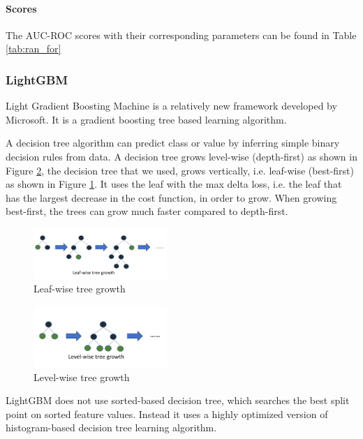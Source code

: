 \documentclass[sigconf, nonacm]{acmart}
\begin{document}
\paragraph{Scores}
The AUC-ROC scores with their corresponding parameters can be found in Table \ref{tab:ran_for}

\subsubsection{LightGBM} \label{subsubsec:lgb}

Light Gradient Boosting Machine\cite{Ke2017LightGBMAH} is a relatively new framework developed by Microsoft. It is a gradient boosting tree based learning algorithm.

A decision tree algorithm can predict class or value by inferring simple binary decision rules from data. A decision tree grows level-wise (depth-first) as shown in Figure \ref{fig:lgb_level}, the decision tree that we used, grows vertically, i.e. leaf-wise (best-first) as shown in Figure \ref{fig:lgb_leaf}. It uses the leaf with the max delta loss, i.e. the leaf that has the largest decrease in the cost function, in order to grow. When growing best-first, the trees can grow much faster compared to depth-first.

\begin{figure}[h]
	\centering
	\includegraphics[width=0.45\textwidth]{lgb/1_AZsSoXb8lc5N6mnhqX5JCg.png}
	\caption{Leaf-wise tree growth}
	\label{fig:lgb_leaf}
\end{figure}

\begin{figure}[h]
	\centering
	\includegraphics[width=0.45\textwidth]{lgb/1_whSa8rY4sgFQj1rEcWr8Ag.png}
	\caption{Level-wise tree growth}
	\label{fig:lgb_level}
\end{figure}

LightGBM does not use sorted-based decision tree, which searches the best split point on sorted feature values. Instead it uses a highly optimized version of histogram-based decision tree learning algorithm.
\end{document}
